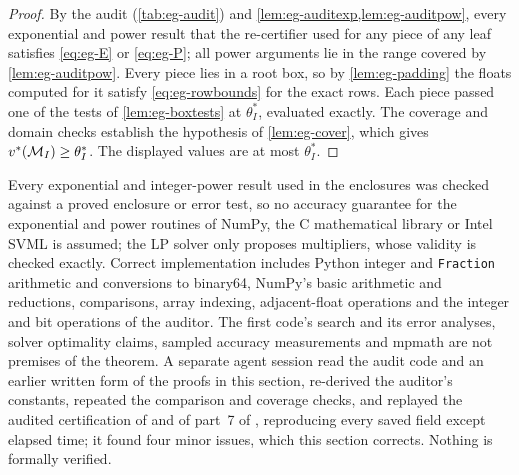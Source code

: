 \begin{proof}
By the audit (\cref{tab:eg-audit}) and \cref{lem:eg-auditexp,lem:eg-auditpow}, every exponential and power result that the re-certifier used for any piece of any leaf satisfies \eqref{eq:eg-E} or \eqref{eq:eg-P}; all power arguments lie in the range covered by \cref{lem:eg-auditpow}.
Every piece lies in a root box, so by \cref{lem:eg-padding} the floats computed for it satisfy \eqref{eq:eg-rowbounds} for the exact rows.
Each piece passed one of the tests of \cref{lem:eg-boxtests} at $\theta^*_I$, evaluated exactly.
The coverage and domain checks establish the hypothesis of \cref{lem:eg-cover}, which gives $v^{*}(\mathcal{M}_I)\ge\theta^*_I$.
The displayed values are at most $\theta^*_I$.
\end{proof}

Every exponential and integer-power result used in the enclosures was checked against a proved enclosure or error test, so no accuracy guarantee for the exponential and power routines of NumPy, the C mathematical library or Intel SVML is assumed; the LP solver only proposes multipliers, whose validity is checked exactly.
Correct implementation includes Python integer and \texttt{Fraction} arithmetic and conversions to binary64, NumPy's basic arithmetic and reductions, comparisons, array indexing, adjacent-float operations and the integer and bit operations of the auditor.
The first code's search and its error analyses, solver optimality claims, sampled accuracy measurements and mpmath are not premises of the theorem.
A separate agent session read the audit code and an earlier written form of the proofs in this section, re-derived the auditor's constants, repeated the comparison and coverage checks, and replayed the audited certification of  and of part~7 of , reproducing every saved field except elapsed time; it found four minor issues, which this section corrects.
Nothing is formally verified.

